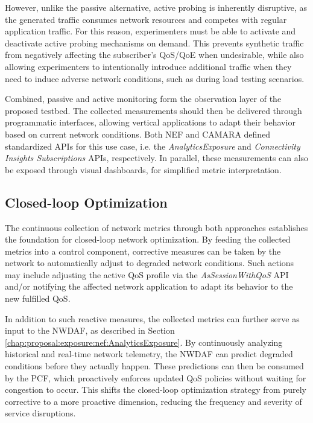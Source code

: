 However, unlike the passive alternative, active probing is inherently disruptive, as the generated traffic consumes network resources and competes with regular application traffic. For this reason, experimenters must be able to activate and deactivate active probing mechanisms on demand. This prevents synthetic traffic from negatively affecting the subscriber’s \acs{QoS}/\acs{QoE} when undesirable, while also allowing experimenters to intentionally introduce additional traffic when they need to induce adverse network conditions, such as during load testing scenarios.

Combined, passive and active monitoring form the observation layer of the proposed testbed. The collected measurements should then be delivered through programmatic interfaces, allowing vertical applications to adapt their behavior based on current network conditions. Both \acs{NEF} and CAMARA defined standardized \acsp{API} for this use case, i.e. the \textit{AnalyticsExposure} and \textit{Connectivity Insights Subscriptions} \acsp{API}, respectively. In parallel, these measurements can also be exposed through visual dashboards, for simplified metric interpretation.

\subsection{Closed-loop Optimization}

The continuous collection of network metrics through both approaches establishes the foundation for closed-loop network optimization. By feeding the collected metrics into a control component, corrective measures can be taken by the network to automatically adjust to degraded network conditions. Such actions may include adjusting the active \acs{QoS} profile via the \textit{AsSessionWithQoS} \acs{API} and/or notifying the affected network application to adapt its behavior to the new fulfilled \acs{QoS}.

In addition to such reactive measures, the collected metrics can further serve as input to the \acs{NWDAF}, as described in Section \ref{chap:proposal:exposure:nef:AnalyticsExposure}. By continuously analyzing historical and real-time network telemetry, the \acs{NWDAF} can predict degraded conditions before they actually happen. These predictions can then be consumed by the \acs{PCF}, which proactively enforces updated \acs{QoS} policies without waiting for congestion to occur. This shifts the closed-loop optimization strategy from purely corrective to a more proactive dimension, reducing the frequency and severity of service disruptions.
